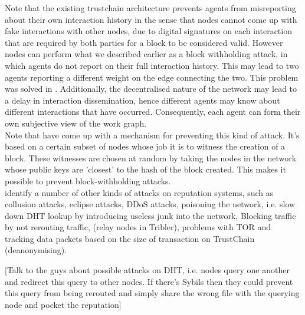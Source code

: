 \documentclass[11pt,a4paper]{report}
\theoremstyle{definition}
\theoremstyle{theorem}
\theoremstyle{proposition}
\theoremstyle{corollary}
\theoremstyle{lemma}
\theoremstyle{example}
\theoremstyle{remark}
\begin{document}
\noindent{}Note that the existing trustchain architecture prevents agents from misreporting about their own interaction history in the sense that nodes cannot come up with fake interactions with other nodes, due to digital signatures on each interaction that are required by both parties for a block to be considered valid. However nodes can perform what we described earlier as a block withholding attack, in which agents do not report on their full interaction history. This may lead to two agents reporting a different weight on the edge connecting the two. This problem was solved in \cite{Jetse's work}. Additionally, the decentralised nature of the network may lead to a delay in interaction dissemination, hence different agents may know about different interactions that have occurred. Consequently, each agent can form their own subjective view of the work graph. \vspace{1em}\\

\noindent{}Note that \cite{Jetse's work} have come up with a mechanism for preventing this kind of attack. It's based on a certain subset of nodes whose job it is to witness the creation of a block. These witnesses are chosen at random by taking the nodes in the network whose public keys are 'closest' to the hash of the block created. This makes it possible to prevent block-withholding attacks. \vspace{1em}\\

\noindent{}\cite{A Survey of Peer-to-Peer Network Security Issues} identify a number of other kinds of attacks on reputation systems, such as collusion attacks, eclipse attacks, DDoS attacks, poisoning the network, i.e. slow down DHT lookup by introducing useless junk into the network, Blocking traffic by not rerouting traffic, (relay nodes in Tribler), problems with TOR and tracking data packets based on the size of transaction on TrustChain (deanonymising). \vspace{1em}\\

\noindent{}\begin{center} [Talk to the guys about possible attacks on DHT, i.e. nodes query one another and redirect this query to other nodes. If there's Sybils then they could prevent this query from being rerouted and simply share the wrong file with the querying node and pocket the reputation] \vspace{1em}\\ \end{center} 
\end{document}
